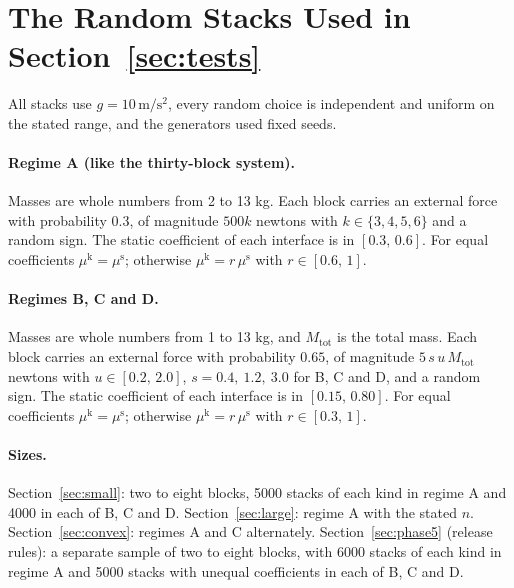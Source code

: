 \documentclass[11pt,a4paper]{article}
\newcommand{\mus}{\mu^{\mathrm{s}}}
\newcommand{\muk}{\mu^{\mathrm{k}}}
\begin{document}
\section{The Random Stacks Used in Section~\ref{sec:tests}}\label{app:random}

All stacks use $g=10\,\mathrm{m/s^2}$, every random choice is independent and uniform on the stated range, and the generators used fixed seeds.

\paragraph{Regime A (like the thirty-block system).} Masses are whole numbers from 2 to 13 kg. Each block carries an external force with probability $0.3$, of magnitude $500k$ newtons with $k\in\{3,4,5,6\}$ and a random sign. The static coefficient of each interface is in $[0.3,\,0.6]$. For equal coefficients $\muk=\mus$; otherwise $\muk=r\,\mus$ with $r\in[0.6,\,1]$.

\paragraph{Regimes B, C and D.} Masses are whole numbers from 1 to 13 kg, and $M_{\mathrm{tot}}$ is the total mass. Each block carries an external force with probability $0.65$, of magnitude $5\,s\,u\,M_{\mathrm{tot}}$ newtons with $u\in[0.2,\,2.0]$, $s=0.4,\ 1.2,\ 3.0$ for B, C and D, and a random sign. The static coefficient of each interface is in $[0.15,\,0.80]$. For equal coefficients $\muk=\mus$; otherwise $\muk=r\,\mus$ with $r\in[0.3,\,1]$.

\paragraph{Sizes.} Section~\ref{sec:small}: two to eight blocks, 5000 stacks of each kind in regime A and 4000 in each of B, C and D. Section~\ref{sec:large}: regime A with the stated $n$. Section~\ref{sec:convex}: regimes A and C alternately. Section~\ref{sec:phase5} (release rules): a separate sample of two to eight blocks, with 6000 stacks of each kind in regime A and 5000 stacks with unequal coefficients in each of B, C and D.
\end{document}

